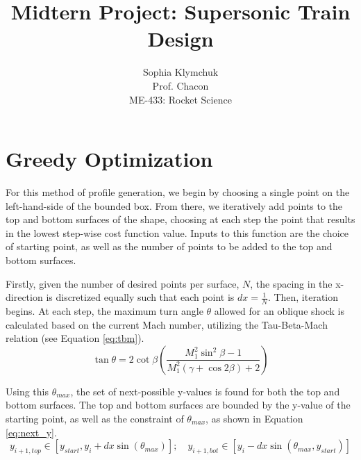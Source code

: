 \documentclass[11pt]{article}
\title{Midtern Project: Supersonic Train Design}
\author{Sophia Klymchuk \\
\small Prof. Chacon \\ 
\small ME-433: Rocket Science}
\begin{document}
\maketitle

\section{Greedy Optimization}
For this method of profile generation, we begin by choosing a single point on the left-hand-side of the bounded box. From there, we iteratively add points to the top and bottom surfaces of the shape, choosing at each step the point that results in the lowest step-wise cost function value. Inputs to this function are the choice of starting point, as well as the number of points to be added to the top and bottom surfaces.

Firstly, given the number of desired points per surface, $N$, the spacing in the x-direction is discretized equally such that each point is $dx = \frac{1}{N}$. Then, iteration begins. At each step, the maximum turn angle $\theta$ allowed for an oblique shock is calculated based on the current Mach number, utilizing the Tau-Beta-Mach relation (see Equation \ref{eq:tbm}).
\begin{equation}\label{eq:tbm}
\tan\theta = 2\cot\beta 
\left( \frac{M_1^2 \sin^2\beta - 1}{M_1^2 (\gamma + \cos 2\beta) + 2} \right)
\end{equation}

Using this $\theta_{max}$, the set of next-possible y-values is found for both the top and bottom surfaces. The top and bottom surfaces are bounded by the y-value of the starting point, as well as the constraint of $\theta_{max}$, as shown in Equation \ref{eq:next_y}.
\begin{equation}\label{eq:next_y}
    y_{i+1, top} \in \left[y_{start}, y_{i} + dx\sin(\theta_{max}) \right]; \quad y_{i+1, bot} \in \left[y_{i} - dx\sin(\theta_{max}, y_{start}) \right]
\end{equation}
\end{document}

